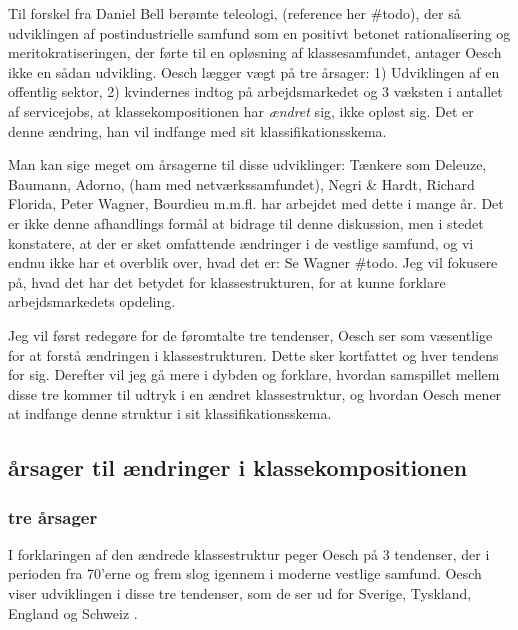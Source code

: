 
Til forskel fra Daniel Bell berømte teleologi, (reference her \#todo), der så udviklingen af postindustrielle samfund som en positivt betonet rationalisering og meritokratiseringen, der førte til en opløsning af klassesamfundet, antager Oesch ikke en sådan udvikling. Oesch lægger vægt på tre årsager: 1) Udviklingen af en offentlig sektor, 2) kvindernes indtog på arbejdsmarkedet og 3  væksten i antallet af servicejobs, at klassekompositionen har \emph{ændret} sig, ikke opløst sig. Det er denne ændring, han vil indfange med sit klassifikationsskema.  

Man kan sige meget om årsagerne til disse udviklinger: Tænkere som Deleuze, Baumann, Adorno, (ham med netværkssamfundet), Negri \& Hardt, Richard Florida, Peter Wagner, Bourdieu m.m.fl. har arbejdet med dette i mange år. Det er ikke denne afhandlings formål at bidrage til denne diskussion, men i stedet konstatere, at der er sket omfattende ændringer i de vestlige samfund, og vi endnu ikke har et overblik over, hvad det er: Se Wagner \#todo. Jeg vil fokusere på, hvad det har det betydet for klassestrukturen, for at kunne forklare arbejdsmarkedets opdeling.  

Jeg vil først redegøre for de føromtalte tre tendenser, Oesch ser som væsentlige for at forstå ændringen i klassestrukturen. Dette sker kortfattet og hver tendens for sig. Derefter vil jeg gå mere i dybden og forklare, hvordan samspillet mellem disse tre kommer til udtryk i en ændret klassestruktur, og hvordan Oesch mener at indfange denne struktur i sit klassifikationsskema. 

%
\subsection{årsager til ændringer i klassekompositionen \label{  subsec teori klasse Oesch aarsager}}
%

%
\subsubsection{tre årsager}
%



I forklaringen af den ændrede klassestruktur peger Oesch på 3 tendenser, der i perioden fra 70'erne og frem slog igennem i moderne vestlige samfund. Oesch viser udviklingen i disse tre tendenser, som de ser ud for Sverige, Tyskland, England og Schweiz \parencite[30]{Oesch2006a}.

